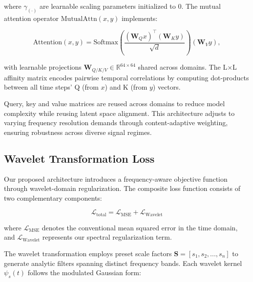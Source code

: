 \documentclass[12pt]{article}
\begin{document}
where $\gamma_{(\cdot)}$ are learnable scaling parameters initialized to 0. The mutual attention operator $\text{MutualAttn}(x,y)$ implements:

\begin{equation}
    \text{Attention}(x,y) = \text{Softmax}\left(\frac{(\mathbf{W}_Q x)^\top (\mathbf{W}_K y)}{\sqrt{d}}\right)(\mathbf{W}_V y),
\end{equation}

\noindent with learnable projections $\mathbf{W}_{Q/K/V} \in \mathbb{R}^{64 \times 64}$ shared across domains. The L×L affinity matrix encodes pairwise temporal correlations by computing dot-products between all time steps' Q (from $x$) and K (from $y$) vectors.



Query, key and value matrices are reused across domains to reduce model complexity while reusing latent space alignment. This architecture adjusts to varying frequency resolution demands through content-adaptive weighting, ensuring robustness across diverse signal regimes.


\subsection{Wavelet Transformation Loss}

Our proposed architecture introduces a frequency-aware objective function through wavelet-domain regularization. The composite loss function consists of two complementary components:

\begin{equation}
    \mathcal{L}_{\text{total}} = \mathcal{L}_{\text{MSE}} + \mathcal{L}_{\text{Wavelet}}
    \label{eq:combined_loss}
\end{equation}

where $\mathcal{L}_{\text{MSE}}$ denotes the conventional mean squared error in the time domain, and $\mathcal{L}_{\text{Wavelet}}$ represents our spectral regularization term.


The wavelet transformation employs preset scale factors $\mathbf{S} = [s_1, s_2, ..., s_n]$ to generate analytic filters spanning distinct frequency bands. Each wavelet kernel $\psi_s(t)$ follows the modulated Gaussian form:
\end{document}
